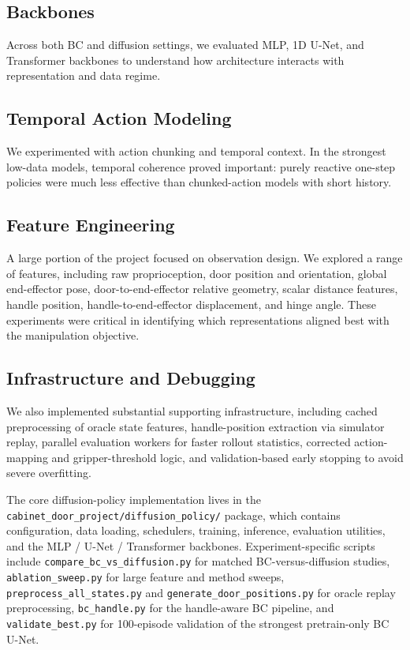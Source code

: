 \documentclass[10pt,conference]{IEEEtran}
\begin{document}
\subsection{Backbones}
Across both BC and diffusion settings, we evaluated MLP, 1D U-Net, and Transformer backbones to understand how architecture interacts with representation and data regime.

\subsection{Temporal Action Modeling}
We experimented with action chunking and temporal context. In the strongest low-data models, temporal coherence proved important: purely reactive one-step policies were much less effective than chunked-action models with short history.

\subsection{Feature Engineering}
A large portion of the project focused on observation design. We explored a range of features, including raw proprioception, door position and orientation, global end-effector pose, door-to-end-effector relative geometry, scalar distance features, handle position, handle-to-end-effector displacement, and hinge angle. These experiments were critical in identifying which representations aligned best with the manipulation objective.

\subsection{Infrastructure and Debugging}
We also implemented substantial supporting infrastructure, including cached preprocessing of oracle state features, handle-position extraction via simulator replay, parallel evaluation workers for faster rollout statistics, corrected action-mapping and gripper-threshold logic, and validation-based early stopping to avoid severe overfitting.

The core diffusion-policy implementation lives in the \texttt{cabinet\_door\_project/diffusion\_policy/} package, which contains configuration, data loading, schedulers, training, inference, evaluation utilities, and the MLP / U-Net / Transformer backbones. Experiment-specific scripts include \texttt{compare\_bc\_vs\_diffusion.py} for matched BC-versus-diffusion studies, \texttt{ablation\_sweep.py} for large feature and method sweeps, \texttt{preprocess\_all\_states.py} and \texttt{generate\_door\_positions.py} for oracle replay preprocessing, \texttt{bc\_handle.py} for the handle-aware BC pipeline, and \texttt{validate\_best.py} for 100-episode validation of the strongest pretrain-only BC U-Net.
\end{document}
